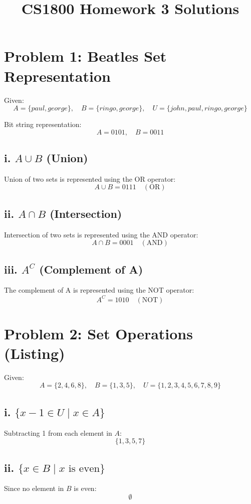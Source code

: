 \documentclass{article}
\title{CS1800 Homework 3 Solutions}
\author{}
\date{}
\begin{document}
\maketitle
\newpage

\section*{Problem 1: Beatles Set Representation}

Given:
\[
A = \{paul, george\}, \quad B = \{ringo, george\}, \quad U = \{john, paul, ringo, george\}
\]

Bit string representation:
\[
A = 0 1 0 1, \quad B = 0 0 1 1
\]

\subsection*{i. \( A \cup B \) (Union)}
Union of two sets is represented using the OR operator:
\[
A \cup B = 0 1 1 1 \quad (\text{OR})
\]

\subsection*{ii. \( A \cap B \) (Intersection)}
Intersection of two sets is represented using the AND operator:
\[
A \cap B = 0 0 0 1 \quad (\text{AND})
\]

\subsection*{iii. \( A^C \) (Complement of A)}
The complement of A is represented using the NOT operator:
\[
A^C = 1 0 1 0 \quad (\text{NOT})
\]

\newpage

\section*{Problem 2: Set Operations (Listing)}

Given:
\[
A = \{2, 4, 6, 8\}, \quad B = \{1, 3, 5\}, \quad U = \{1, 2, 3, 4, 5, 6, 7, 8, 9\}
\]

\subsection*{i. \( \{x - 1 \in U \mid x \in A \} \)}
Subtracting 1 from each element in \(A\):
\[
\{1, 3, 5, 7\}
\]

\subsection*{ii. \( \{x \in B \mid x \text{ is even}\} \)}
Since no element in \(B\) is even:
\[
\emptyset
\]
\end{document}
